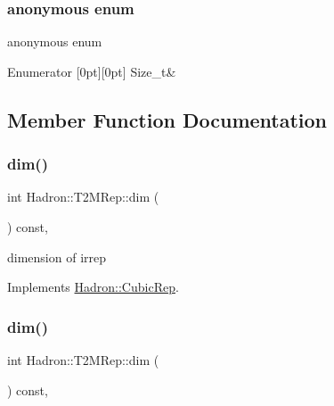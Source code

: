 \subsubsection{\texorpdfstring{anonymous enum}{anonymous enum}}
{\footnotesize\ttfamily anonymous enum}

\begin{DoxyEnumFields}{Enumerator}
[0pt][0pt]{}\mbox{\label{structHadron_1_1T2MRep_ae54ab133c50e92b5a400a822386d1e43a8c066d0d652b6dd6f011f24db92e8d34}} 
Size\+\_\+t&\\
\hline

\end{DoxyEnumFields}


\subsection{Member Function Documentation}
\mbox{\label{structHadron_1_1T2MRep_abb2e2a4877683fa8987cdd01d64a88a4}} 
\subsubsection{\texorpdfstring{dim()}{dim()}\hspace{0.1cm}{\footnotesize\ttfamily [1/2]}}
{\footnotesize\ttfamily int Hadron\+::\+T2\+M\+Rep\+::dim (\begin{DoxyParamCaption}{ }\end{DoxyParamCaption}) const\hspace{0.3cm}{\ttfamily [inline]}, {\ttfamily [virtual]}}

dimension of irrep 

Implements \mbox{\hyperlink{structHadron_1_1CubicRep_ac178d14064f037a66af4b9fb4b312d51}{Hadron\+::\+Cubic\+Rep}}.

\mbox{\label{structHadron_1_1T2MRep_abb2e2a4877683fa8987cdd01d64a88a4}} 
\subsubsection{\texorpdfstring{dim()}{dim()}\hspace{0.1cm}{\footnotesize\ttfamily [2/2]}}
{\footnotesize\ttfamily int Hadron\+::\+T2\+M\+Rep\+::dim (\begin{DoxyParamCaption}{ }\end{DoxyParamCaption}) const\hspace{0.3cm}{\ttfamily [inline]}, {\ttfamily [virtual]}}

